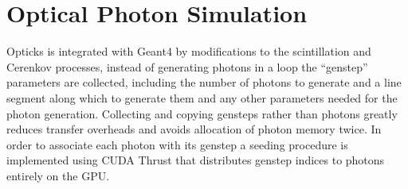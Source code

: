 \documentclass[a4paper]{jpconf}
\begin{document}
%
%
% 
% 
% 


\section{Optical Photon Simulation}

Opticks is integrated with Geant4 by modifications to the 
scintillation and Cerenkov processes, instead of 
generating photons in a loop the ``genstep'' parameters are collected, 
including the number of photons to generate and a line segment 
along which to generate them and any other parameters needed for the 
photon generation.
%
Collecting and copying gensteps rather than photons greatly reduces 
transfer overheads and avoids allocation of photon memory twice.
In order to associate each photon with its genstep a seeding 
procedure is implemented using CUDA Thrust\cite{thrust}\cite{thrustURL} 
that distributes genstep indices to photons entirely on the GPU.
\end{document}

